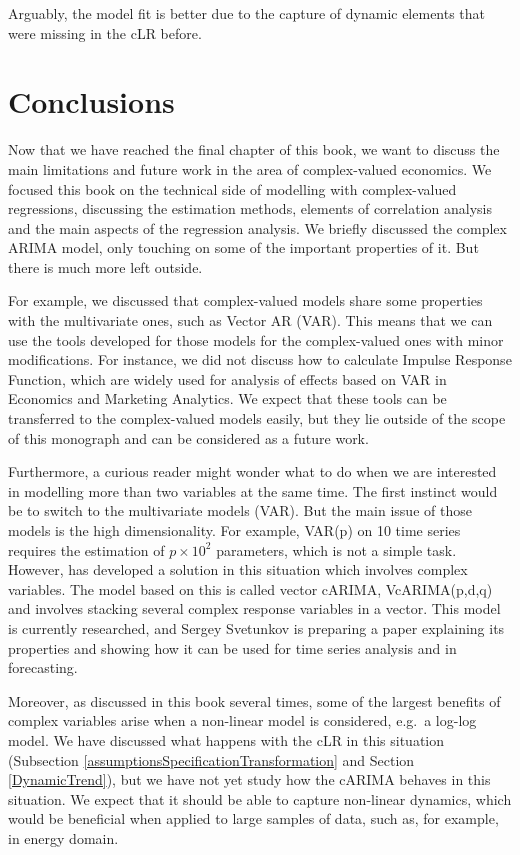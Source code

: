 \documentclass[
]{book}
\begin{document}
Arguably, the model fit is better due to the capture of dynamic elements that were missing in the cLR before.

\hypertarget{conclusions}{%
\chapter*{Conclusions}\label{conclusions}}

Now that we have reached the final chapter of this book, we want to discuss the main limitations and future work in the area of complex-valued economics. We focused this book on the technical side of modelling with complex-valued regressions, discussing the estimation methods, elements of correlation analysis and the main aspects of the regression analysis. We briefly discussed the complex ARIMA model, only touching on some of the important properties of it. But there is much more left outside.

For example, we discussed that complex-valued models share some properties with the multivariate ones, such as Vector AR (VAR). This means that we can use the tools developed for those models for the complex-valued ones with minor modifications. For instance, we did not discuss how to calculate Impulse Response Function, which are widely used for analysis of effects based on VAR in Economics and Marketing Analytics. We expect that these tools can be transferred to the complex-valued models easily, but they lie outside of the scope of this monograph and can be considered as a future work.

Furthermore, a curious reader might wonder what to do when we are interested in modelling more than two variables at the same time. The first instinct would be to switch to the multivariate models (VAR). But the main issue of those models is the high dimensionality. For example, VAR(p) on 10 time series requires the estimation of \(p \times 10^2\) parameters, which is not a simple task. However, \citet{SvetunkovSergey} has developed a solution in this situation which involves complex variables. The model based on this is called vector cARIMA, VcARIMA(p,d,q) and involves stacking several complex response variables in a vector. This model is currently researched, and Sergey Svetunkov is preparing a paper explaining its properties and showing how it can be used for time series analysis and in forecasting.

Moreover, as discussed in this book several times, some of the largest benefits of complex variables arise when a non-linear model is considered, e.g.~a log-log model. We have discussed what happens with the cLR in this situation (Subsection \ref{assumptionsSpecificationTransformation} and Section \ref{DynamicTrend}), but we have not yet study how the cARIMA behaves in this situation. We expect that it should be able to capture non-linear dynamics, which would be beneficial when applied to large samples of data, such as, for example, in energy domain.

  
\end{document}
